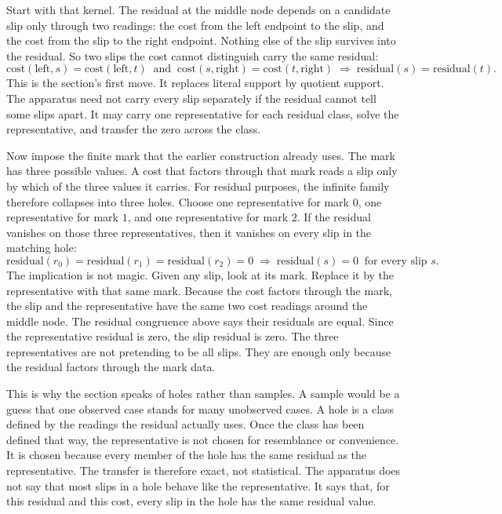 Start with that kernel. The residual at the middle node depends on a candidate
slip only through two readings: the cost from the left endpoint to the slip, and
the cost from the slip to the right endpoint. Nothing else of the slip survives
into the residual. So two slips the cost cannot distinguish carry the same
residual:
\[
  \text{cost}(\text{left}, s) = \text{cost}(\text{left}, t)
  \ \text{ and }\
  \text{cost}(s, \text{right}) = \text{cost}(t, \text{right})
  \;\Longrightarrow\;
  \text{residual}(s) = \text{residual}(t).
\]
This is the section's first move. It replaces literal support by quotient
support. The apparatus need not carry every slip separately if the residual
cannot tell some slips apart. It may carry one representative for each residual
class, solve the representative, and transfer the zero across the class.

Now impose the finite mark that the earlier construction already uses. The mark has
three possible values. A cost that factors through that mark reads a slip only by
which of the three values it carries. For residual purposes, the infinite family
therefore collapses into three holes. Choose one representative for mark \(0\),
one representative for mark \(1\), and one representative for mark \(2\). If the
residual vanishes on those three representatives, then it vanishes on every slip
in the matching hole:
\[
  \text{residual}(r_0) = \text{residual}(r_1) = \text{residual}(r_2) = 0
  \;\Longrightarrow\;
  \text{residual}(s) = 0 \ \text{ for every slip } s.
\]
The implication is not magic. Given any slip, look at its mark. Replace it by the
representative with that same mark. Because the cost factors through the mark, the slip
and the representative have the same two cost readings around the middle node.
The residual congruence above says their residuals are equal. Since the
representative residual is zero, the slip residual is zero. The three
representatives are not pretending to be all slips. They are enough only because
the residual factors through the mark data.

This is why the section speaks of holes rather than samples. A sample would be a
guess that one observed case stands for many unobserved cases. A hole is a class
defined by the readings the residual actually uses. Once the class has been
defined that way, the representative is not chosen for resemblance or convenience.
It is chosen because every member of the hole has the same residual as the
representative. The transfer is therefore exact, not statistical. The apparatus
does not say that most slips in a hole behave like the representative. It says
that, for this residual and this cost, every slip in the hole has the same
residual value.

